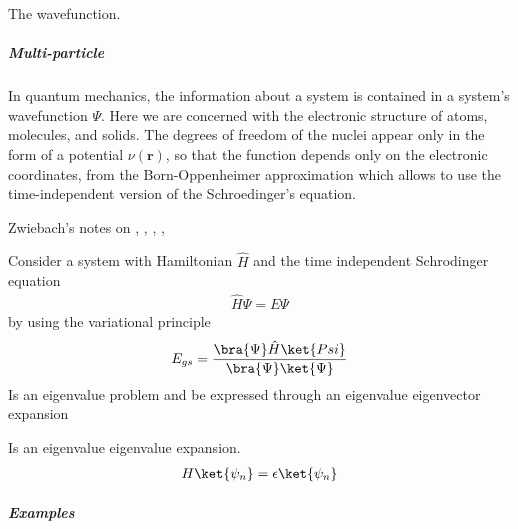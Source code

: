 \documentclass[letterpaper,10pt,english]{sphinxmanual}
\begin{document}
The wavefunction.


\subparagraph{Multi-particle}
\label{\detokenize{dft/dft_intro:multi-particle}}
In quantum mechanics, the information about a system is contained in a system’s wavefunction \(\Psi\).  Here we are concerned with the electronic structure of atoms, molecules, and solids.  The degrees of freedom of the nuclei appear only in the form of a potential \(\nu(\mathbf{r})\), so that the function depends only on the electronic coordinates, from the Born-Oppenheimer approximation which allows to use the time-independent version of the Schroedinger’s equation.

Zwiebach’s notes on
,
,
,
,

Consider a system with Hamiltonian \(\hat{H}\) and the time independent Schrodinger equation
\begin{equation*}
\begin{split}\hat{H}\Psi = E\Psi\end{split}
\end{equation*}
by using the variational principle
\begin{equation*}
\begin{split}E_{gs} = \frac{\bra{\Psi}\hat{H}\ket{Psi}}
              {\bra{\Psi}\ket{\Psi}}\end{split}
\end{equation*}
Is an eigenvalue problem and be expressed through an eigenvalue eigenvector expansion

Is an eigenvalue eigenvalue expansion.
\begin{equation*}
\begin{split}H\ket{\psi_n}=\epsilon\ket{\psi_n}\end{split}
\end{equation*}

\subparagraph{Examples}
\label{\detokenize{dft/dft_intro:examples}}
\end{document}
